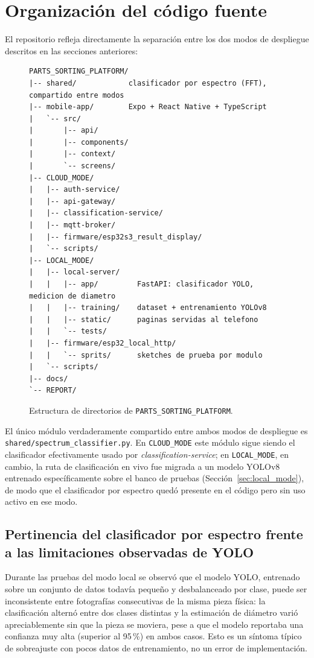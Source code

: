 \section{Organización del código fuente}
\label{sec:codebase}

El repositorio refleja directamente la separación entre los dos modos
de despliegue descritos en las secciones anteriores:

\begin{figure}[!t]
\centering
\begin{verbatim}
PARTS_SORTING_PLATFORM/
|-- shared/            clasificador por espectro (FFT), compartido entre modos
|-- mobile-app/        Expo + React Native + TypeScript
|   `-- src/
|       |-- api/
|       |-- components/
|       |-- context/
|       `-- screens/
|-- CLOUD_MODE/
|   |-- auth-service/
|   |-- api-gateway/
|   |-- classification-service/
|   |-- mqtt-broker/
|   |-- firmware/esp32s3_result_display/
|   `-- scripts/
|-- LOCAL_MODE/
|   |-- local-server/
|   |   |-- app/         FastAPI: clasificador YOLO, medicion de diametro
|   |   |-- training/    dataset + entrenamiento YOLOv8
|   |   |-- static/      paginas servidas al telefono
|   |   `-- tests/
|   |-- firmware/esp32_local_http/
|   |   `-- sprits/      sketches de prueba por modulo
|   `-- scripts/
|-- docs/
`-- REPORT/
\end{verbatim}
\caption{Estructura de directorios de \texttt{PARTS\_SORTING\_PLATFORM}.}
\label{fig:codebase_tree}
\end{figure}

El único módulo verdaderamente compartido entre ambos modos de
despliegue es \texttt{shared/spectrum\_classifier.py}. En
\texttt{CLOUD\_MODE} este módulo sigue siendo el clasificador
efectivamente usado por \textit{classification-service}; en
\texttt{LOCAL\_MODE}, en cambio, la ruta de clasificación en vivo fue
migrada a un modelo YOLOv8 entrenado específicamente sobre el banco de
pruebas (Sección~\ref{sec:local_mode}), de modo que el clasificador por
espectro quedó presente en el código pero sin uso activo en ese modo.

\subsection{Pertinencia del clasificador por espectro frente a las limitaciones observadas de YOLO}

Durante las pruebas del modo local se observó que el modelo YOLO,
entrenado sobre un conjunto de datos todavía pequeño y desbalanceado
por clase, puede ser inconsistente entre fotografías consecutivas de
la misma pieza física: la clasificación alternó entre dos clases
distintas y la estimación de diámetro varió apreciablemente sin que la
pieza se moviera, pese a que el modelo reportaba una confianza muy alta
(superior al 95\,\%) en ambos casos. Esto es un síntoma típico de
sobreajuste con pocos datos de entrenamiento, no un error de
implementación.

